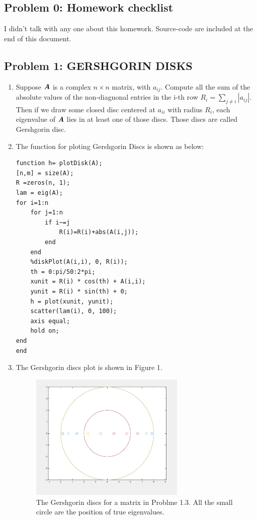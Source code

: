 \documentclass{article}
\begin{document}
 



\hypertarget{problem_0_homework_checklist_2}{}
\subsection*{{Problem 0: Homework checklist}}
\label{}

\checkmark	I didn't talk with any one about this homework. \newline
\checkmark 	Source-code are included at the end of this document. 

\hypertarget{}{}
\subsection*{{Problem 1: GERSHGORIN DISKS }}

\begin{enumerate} 
\item 
Suppose $\boldsymbol{A}$ is a complex $n\times n$ matrix, with $a_{ij}$. Compute all the sum of the absolute values of the non-diagnonal entries in the i-th row $R_i=\sum_{j\neq i}|a_{ij}| $.   Then if we draw some closed disc centered at $a_{ii}$ with radius $R_i$, each eigenvalue of $\boldsymbol{A}$ lies in at least one of those discs.  Those discs are called Gershgorin disc.  
\item 
The function for ploting Gershgorin Discs is shown as below: \\
\begin{lstlisting} 
function h= plotDisk(A); 
[n,m] = size(A); 
R =zeros(n, 1); 
lam = eig(A); 
for i=1:n 
    for j=1:n
        if i~=j
            R(i)=R(i)+abs(A(i,j)); 
        end
    end
    %diskPlot(A(i,i), 0, R(i)); 
    th = 0:pi/50:2*pi;
    xunit = R(i) * cos(th) + A(i,i);
    yunit = R(i) * sin(th) + 0;
    h = plot(xunit, yunit);
    scatter(lam(i), 0, 100); 
    axis equal; 
    hold on; 
end
end
\end{lstlisting} 

\item
The Gershgorin discs plot is shown in Figure 1. \\
\begin{figure}
\includegraphics[width=0.7\textwidth]{problem1_3} 
\centering 
\caption{The Gershgorin discs for a matrix in Problme 1.3. All the small circle are the position of true eigenvalues.} 
\end{figure}
\end{enumerate}
\end{document}

